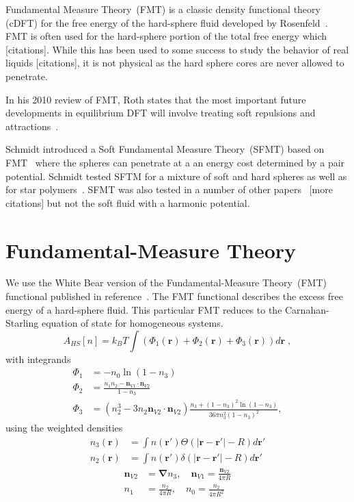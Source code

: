 \documentclass[letterpaper,twocolumn,amsmath,amssymb,prb]{revtex4-1}
\newcommand{\red}[1]{{\color{red} #1}}
\newcommand{\rr}{\textbf{r}}
\newcommand{\fixme}[1]{\red{[#1]}}
\begin{document}
Fundamental Measure Theory~(FMT) is a classic density functional
theory (cDFT) for the free energy of the hard-sphere fluid developed
by Rosenfeld~\cite{rosenfeld1989}.  FMT is often used for the
hard-sphere portion of the total free energy which \fixme{citations}.
While this has been used to some success to study the behavior of real
liquids\fixme{citations}, it is not physical as the hard sphere cores
are never allowed to penetrate.

In his 2010 review of FMT, Roth states that the most important future
developments in equilibrium DFT will involve treating soft repulsions
and attractions~\cite{}.

Schmidt introduced a Soft Fundamental Measure Theory~(SFMT) based on
FMT~\cite{schmidt1999density} where the spheres can penetrate at a an
energy cost determined by a pair potential. Schmidt tested SFTM for a
mixture of soft and hard spheres as well as for star
polymers~\cite{schmidt2000density, groh2001density}. SFMT was also
tested in a number of other papers~\cite{rosenfeld2000fluid}
\fixme{more citations} but not the soft fluid with a harmonic
potential.

\section{Fundamental-Measure Theory}

We use the White Bear version of the Fundamental-Measure Theory~(FMT)
functional published in reference~\cite{roth2002whitebear}.  The FMT
functional describes the excess free energy of a hard-sphere fluid.
This particular FMT reduces to the Carnahan-Starling equation of state
for homogeneous systems.
\begin{equation}
A_\textit{HS}[n] = k_B T \int \left(\Phi_1(\rr) + \Phi_2(\rr) + \Phi_3(\rr)\right) d\rr \; ,
\end{equation}
with integrands
\begin{align}
\Phi_1 &= -n_0 \ln\left( 1 - n_3\right)\\
\Phi_2 &= \frac{n_1 n_2 - \mathbf{n}_{V1} \cdot\mathbf{n}_{V2}}{1-n_3} \\
\Phi_3 &= (n_2^3 - 3 n_2 \mathbf{n}_{V2} \cdot \mathbf{n}_{V2}) \frac{
  n_3 + (1-n_3)^2 \ln(1-n_3)
}{
  36\pi n_3^2\left( 1 - n_3 \right)^2
} ,
\end{align}
using the weighted densities
\begin{align}
  n_3(\rr) &= \int n(\rr') \Theta(\left|\rr - \rr'\right| - R) d\rr' \\
  n_2(\rr) &= \int n(\rr') \delta(\left|\rr - \rr'\right| - R) d\rr'
\end{align}
\begin{align}
  \mathbf{n}_{V2} &= \mathbf{\nabla} n_3 , \quad
  \mathbf{n}_{V1} = \frac{\mathbf{n}_{V2}}{4\pi R} \\
  n_1 &= \frac{n_2}{4\pi R} , \quad
  n_0 = \frac{n_2}{4\pi R^2}
\end{align}
\end{document}
